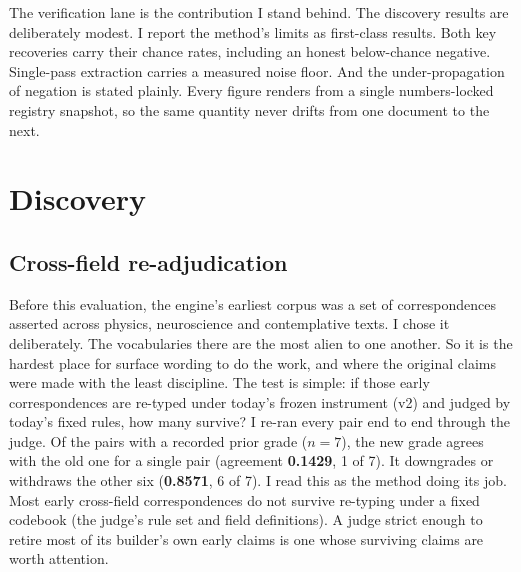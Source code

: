 \documentclass[11pt]{article}
\begin{document}
The verification lane is the contribution I stand behind. The discovery results are deliberately modest. I
report the method's limits as first-class results. Both key recoveries carry their chance rates, including
an honest below-chance negative. Single-pass extraction carries a measured noise floor. And the
under-propagation of negation is stated plainly. Every figure renders from a single numbers-locked registry
snapshot, so the same quantity never drifts from one document to the next.

\section{Discovery}

\subsection{Cross-field re-adjudication}
Before this evaluation, the engine's earliest corpus was a set of correspondences asserted across physics,
neuroscience and contemplative texts. I chose it deliberately. The vocabularies there are the most alien to
one another. So it is the hardest place for surface wording to do the work, and where the original claims
were made with the least discipline. The test is simple: if those early correspondences are re-typed
under today's frozen instrument (v2) and judged by today's fixed rules, how many survive? I re-ran every
pair end to end through the judge. Of the pairs with a recorded prior grade ($n = 7$), the new grade agrees
with the old one for a single pair (agreement \textbf{0.1429}, 1 of 7). It downgrades or withdraws the
other six (\textbf{0.8571}, 6 of 7). I read this as the method doing its job. Most early cross-field
correspondences do not survive re-typing under a fixed codebook (the judge's rule set and field
definitions). A judge strict enough to retire most of its builder's own early claims is one whose surviving
claims are worth attention.
\end{document}
